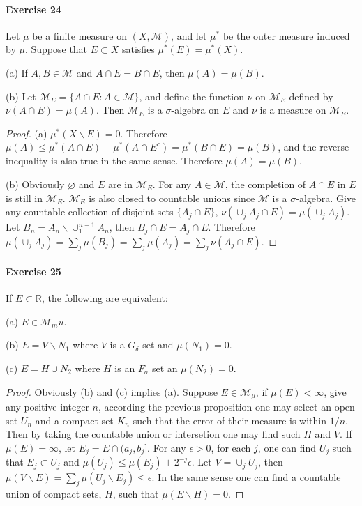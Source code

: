 \paragraph{Exercise 24}
Let $\mu$ be a finite measure on $(X,\mathcal{M})$, and let $\mu^*$ be the outer measure induced by $\mu$. Suppose that $E\subset X$ satisfies $\mu^*(E)=\mu^*(X)$.
\par (a) If $A,B\in\mathcal{M}$ and $A\cap E=B\cap E$, then $\mu(A)=\mu(B)$.
\par (b) Let $\mathcal{M}_E=\{A\cap E:A\in\mathcal{M}\}$, and define the function $\nu$ on $\mathcal{M}_E$ defined by $\nu(A\cap E)=\mu(A)$. Then $\mathcal{M}_E$ is a $\sigma$-algebra on $E$ and $\nu$ is a measure on $\mathcal{M}_E$.
\begin{proof}
    (a) $\mu^*(X\backslash E)=0$. Therefore $\mu(A)\le\mu^*(A\cap E)+\mu^*(A\cap E^c)=\mu^*(B\cap E)=\mu(B)$, and the reverse inequality is also true in the same sense. Therefore $\mu(A)=\mu(B)$.
    \par (b) Obviously $\varnothing$ and $E$ are in $\mathcal{M}_E$. For any $A\in\mathcal{M}$, the completion of $A\cap E$ in $E$ is still in $\mathcal{M}_E$. $\mathcal{M}_E$ is also closed to countable unions since $\mathcal{M}$ is a $\sigma$-algebra. Give any countable collection of disjoint sets $\{A_j\cap E\}$, $\nu(\cup_j A_j\cap E)=\mu(\cup_j A_j)$. Let $B_n=A_n\backslash\cup^{n-1}_1A_n$, then $B_j\cap E=A_j\cap E$. Therefore $\mu(\cup_j A_j)=\sum_j\mu(B_j)=\sum_j\mu(A_j)=\sum_j\nu(A_j\cap E)$.
\end{proof}
\paragraph{Exercise 25}
If $E\subset\mathbb{R}$, the following are equivalent:
\par (a) $E\in\mathcal{M}_mu$.
\par (b) $E=V\backslash N_1$ where $V$ is a $G_\delta$ set and $\mu(N_1)=0$.
\par (c) $E=H\cup N_2$ where $H$ is an $F_\sigma$ set an $\mu(N_2)=0$.
\begin{proof}
    Obviously (b) and (c) implies (a). Suppose $E\in\mathcal{M}_\mu$, if $\mu(E)<\infty$, give any positive integer $n$, according the previous proposition one may select an open set $U_n$ and a compact set $K_n$ such that the error of their measure is within $1/n$. Then by taking the countable union or intersetion one may find such $H$ and $V$. If $\mu(E)=\infty$, let $E_j=E\cap(a_j,b_j]$. For any $\epsilon>0$, for each $j$, one can find $U_j$ such that $E_j\subset U_j$ and $\mu(U_j)\le\mu(E_j)+2^{-j}\epsilon$. Let $V=\cup_j U_j$, then $\mu(V\backslash E)=\sum_j\mu(U_j\backslash E_j)\le\epsilon$. In the same sense one can find a countable union of compact sets, $H$, such that $\mu(E\backslash H)=0$.
\end{proof}
